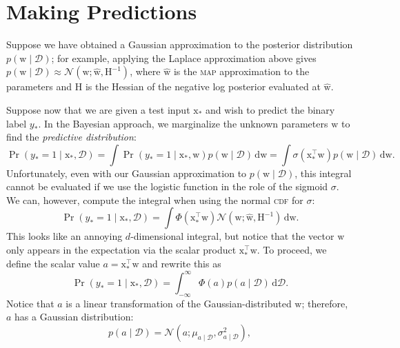 \documentclass{article}
\newcommand{\acro}[1]{\textsc{\MakeLowercase{#1}}}
\newcommand{\given}{\mid}
\newcommand{\mc}[1]{\mathcal{#1}}
\newcommand{\data}{\mc{D}}
\newcommand{\intd}[1]{\,\mathrm{d}{#1}}
\newcommand{\inv}{^{-1}}
\newcommand{\trans}{^\top}
\newcommand{\mat}[1]{\bm{\mathrm{#1}}}
\renewcommand{\vec}[1]{\bm{\mathrm{#1}}}
\begin{document}
\section*{Making Predictions}

Suppose we have obtained a Gaussian approximation to the posterior
distribution $p(\vec{w} \given \data)$; for example, applying the
Laplace approximation above gives $p(\vec{w} \given \data) \approx
\mc{N}(\vec{w}; \hat{\vec{w}}, \mat{H}\inv)$, where $\hat{\vec{w}}$ is
the \acro{MAP} approximation to the parameters and $\mat{H}$ is the
Hessian of the negative log posterior evaluated at $\hat{\vec{w}}$.

Suppose now that we are given a test input $\vec{x}_\ast$ and wish to
predict the binary label $y_\ast$.  In the Bayesian approach, we
marginalize the unknown parameters $\vec{w}$ to find the
\emph{predictive distribution}:
\begin{equation*}
  \Pr(y_\ast = 1 \given \vec{x}_\ast, \data)
  =
  \int
  \Pr(y_\ast = 1 \given \vec{x}_\ast, \vec{w})
  p(\vec{w} \given \data)
  \intd{\vec{w}}
  =
  \int
  \sigma(\vec{x}_\ast\trans \vec{w})
  p(\vec{w} \given \data)
  \intd{\vec{w}}.
\end{equation*}
Unfortunately, even with our Gaussian approximation to $p(\vec{w}
\given \data)$, this integral cannot be evaluated if we use the
logistic function in the role of the sigmoid $\sigma$.  We can,
however, compute the integral when using the normal \acro{CDF} for
$\sigma$:
\begin{equation*}
  \Pr(y_\ast = 1 \given \vec{x}_\ast, \data)
  =
  \int
  \Phi(\vec{x}_\ast\trans \vec{w})
  \mc{N}(\vec{w}; \hat{\vec{w}}, \mat{H}\inv)
  \intd{\vec{w}}.
\end{equation*}
This looks like an annoying $d$-dimensional integral, but notice that
the vector $\vec{w}$ only appears in the expectation via the scalar
product $\vec{x}_\ast\trans \vec{w}$.  To proceed, we define the
scalar value $a = \vec{x}_\ast\trans \vec{w}$ and rewrite this as
\begin{equation*}
  \Pr(y_\ast = 1 \given \vec{x}_\ast, \data)
  =
  \int_{-\infty}^\infty
  \Phi(a)
  p(a \given \data)
  \intd{\data}.
\end{equation*}
Notice that $a$ is a linear transformation of the Gaussian-distributed
$\vec{w}$; therefore, $a$ has a Gaussian distribution:
\begin{equation*}
  p(a \given \data)
  =
  \mc{N}(a; \mu_{a \given \data}, \sigma^2_{a \given \data}),
\end{equation*}
\end{document}
